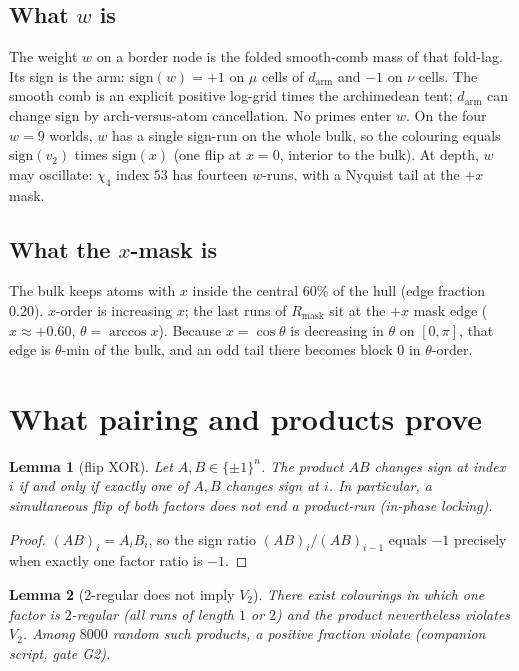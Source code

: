 \documentclass[11pt]{article}
\newtheorem{lemma}{Lemma}
\theoremstyle{remark}
\begin{document}
\subsection{What $w$ is}

The weight $w$ on a border node is the folded smooth-comb mass of
that fold-lag.  Its sign is the arm: $\mathrm{sign}(w)=+1$ on
$\mu$ cells of $d_{\mathrm{arm}}$ and $-1$ on $\nu$ cells.  The
smooth comb is an explicit positive log-grid times the
archimedean tent; $d_{\mathrm{arm}}$ can change sign by
arch-versus-atom cancellation.  No primes enter $w$.  On the four
$w=9$ worlds, $w$ has a single sign-run on the whole bulk, so
the colouring equals $\mathrm{sign}(v_2)$ times $\mathrm{sign}(x)$
(one flip at $x=0$, interior to the bulk).  At depth, $w$ may
oscillate: $\chi_4$ index $53$ has fourteen $w$-runs, with a
Nyquist tail at the $+x$ mask.

\subsection{What the $x$-mask is}

The bulk keeps atoms with $x$ inside the central $60\%$ of the
hull (edge fraction $0.20$).  $x$-order is increasing $x$; the
last runs of $R_{\mathrm{mask}}$ sit at the $+x$ mask edge
($x\approx +0.60$, $\theta=\arccos x$).  Because $x=\cos\theta$ is
decreasing in $\theta$ on $[0,\pi]$, that edge is $\theta$-min of
the bulk, and an odd tail there becomes block $0$ in
$\theta$-order.

\section{What pairing and products prove}\label{sec:comb}

\begin{lemma}[flip XOR]\label{lem:contain}
Let $A,B\in\{\pm 1\}^n$.  The product $AB$ changes sign at index
$i$ if and only if exactly one of $A,B$ changes sign at $i$.
In particular, a simultaneous flip of both factors does
\emph{not} end a product-run (in-phase locking).
\end{lemma}

\begin{proof}
$(AB)_i=A_i B_i$, so the sign ratio
$(AB)_i/(AB)_{i-1}$ equals $-1$ precisely when exactly one factor
ratio is $-1$.
\end{proof}

\begin{lemma}[$2$-regular does not imply $V_2$]\label{lem:2reg}
There exist colourings in which one factor is $2$-regular (all
runs of length $1$ or $2$) and the product nevertheless violates
$V_2$.  Among $8000$ random such products, a positive fraction
violate (companion script, gate G2).
\end{lemma}
\end{document}
